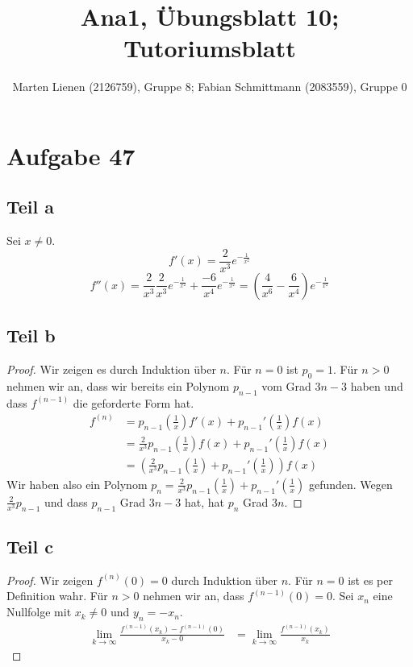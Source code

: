 \documentclass[a4paper,10pt]{article}
\title{Ana1, Übungsblatt 10; Tutoriumsblatt}
\author{Marten Lienen (2126759), Gruppe 8; Fabian Schmittmann (2083559), Gruppe 0}
\begin{document}
\maketitle

\section*{Aufgabe 47}

\subsection*{Teil a}

Sei $x \ne 0$.
\begin{equation}
 f'(x) = \frac{2}{x^3} e^{-\frac{1}{x^2}}
\end{equation}
\begin{equation}
 f''(x) = \frac{2}{x^3} \frac{2}{x^3} e^{-\frac{1}{x^2}} + \frac{-6}{x^4} e^{-\frac{1}{x^2}} = (\frac{4}{x^6} - \frac{6}{x^4}) e^{-\frac{1}{x^2}}
\end{equation}

\subsection*{Teil b}

\begin{proof}
 Wir zeigen es durch Induktion über $n$.
 Für $n = 0$ ist $p_0 = 1$.
 Für $n > 0$ nehmen wir an, dass wir bereits ein Polynom $p_{n - 1}$ vom Grad $3n - 3$ haben und dass $f^{(n - 1)}$ die geforderte Form hat.
 \begin{align*}
  f^{(n)} & = p_{n - 1}(\frac{1}{x}) f'(x) + p_{n - 1}'(\frac{1}{x}) f(x)\\
  & = \frac{2}{x^3} p_{n - 1}(\frac{1}{x}) f(x) + p_{n - 1}'(\frac{1}{x}) f(x)\\
  & = \left( \frac{2}{x^3} p_{n - 1}(\frac{1}{x}) + p_{n - 1}'(\frac{1}{x}) \right) f(x)
 \end{align*}
 Wir haben also ein Polynom $p_n = \frac{2}{x^3} p_{n - 1}(\frac{1}{x}) + p_{n - 1}'(\frac{1}{x})$ gefunden.
 Wegen $\frac{2}{x^3} p_{n - 1}$ und dass $p_{n - 1}$ Grad $3n - 3$ hat, hat $p_n$ Grad $3n$.
\end{proof}

\subsection*{Teil c}

\begin{proof}
 Wir zeigen $f^{(n)}(0) = 0$ durch Induktion über $n$.
 Für $n = 0$ ist es per Definition wahr.
 Für $n > 0$ nehmen wir an, dass $f^{(n - 1)}(0) = 0$.
 Sei $x_n$ eine Nullfolge mit $x_k \ne 0$ und $y_n = -x_n$.
 \begin{align*}
  \lim_{k \rightarrow \infty} \frac{f^{(n - 1)}(x_k) - f^{(n - 1)}(0)}{x_k - 0} & = \lim_{k \rightarrow \infty} \frac{f^{(n - 1)}(x_k)}{x_k}
 \end{align*}

\end{proof}
\end{document}
